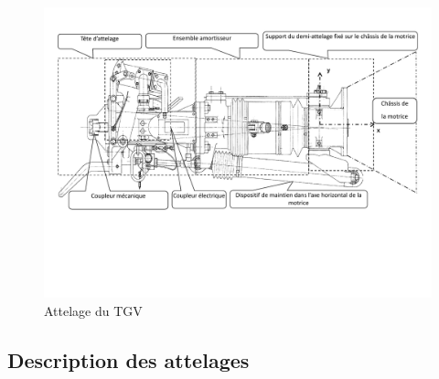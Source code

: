 \begin{figure}[!h]
\centering\includegraphics[width=0.75\linewidth]{img/Image2.pdf}
 \caption{Attelage du TGV}
 \label{img:image2}
\end{figure}

\subsection{Description des attelages}

